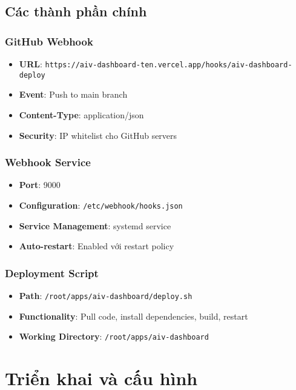\documentclass[12pt,a4paper]{article}
\begin{document}
\subsection{Các thành phần chính}

\subsubsection{GitHub Webhook}
\begin{itemize}
    \item \textbf{URL}: \texttt{https://aiv-dashboard-ten.vercel.app/hooks/aiv-dashboard-deploy}
    \item \textbf{Event}: Push to main branch
    \item \textbf{Content-Type}: application/json
    \item \textbf{Security}: IP whitelist cho GitHub servers
\end{itemize}

\subsubsection{Webhook Service}
\begin{itemize}
    \item \textbf{Port}: 9000
    \item \textbf{Configuration}: \texttt{/etc/webhook/hooks.json}
    \item \textbf{Service Management}: systemd service
    \item \textbf{Auto-restart}: Enabled với restart policy
\end{itemize}

\subsubsection{Deployment Script}
\begin{itemize}
    \item \textbf{Path}: \texttt{/root/apps/aiv-dashboard/deploy.sh}
    \item \textbf{Functionality}: Pull code, install dependencies, build, restart
    \item \textbf{Working Directory}: \texttt{/root/apps/aiv-dashboard}
\end{itemize}

\section{Triển khai và cấu hình}
\end{document}
